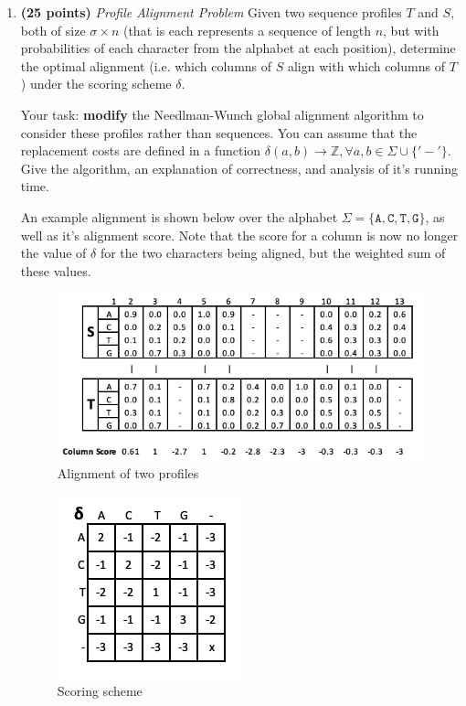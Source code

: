 \documentclass[11pt, oneside]{article}   	%
\begin{document}
\begin{enumerate}
\item \textbf{(25 points)} 
\emph{Profile Alignment Problem} Given two sequence profiles $T$ and $S$, both of size $\sigma \times n$ 
(that is each represents a sequence of length $n$, but with probabilities of each character from the alphabet at each position), 
determine the optimal alignment (i.e. which columns of $S$ align with which columns of $T$) under the scoring scheme $\delta$.

Your task: \textbf{modify} the Needlman-Wunch global alignment algorithm to consider these profiles rather than sequences. 
You can assume that the replacement costs are defined in a function $\delta(a,b) \rightarrow \mathbb{Z} , \forall a,b \in \Sigma \cup \{'-'\}$.
Give the algorithm, an explanation of correctness, and analysis of it's running time. 

An example alignment is shown below over the alphabet $\Sigma=\{\texttt{A},\texttt{C},\texttt{T},\texttt{G}\}$, as well as it's alignment score. 
Note that the score for a column is now no longer the value of $\delta$ for the two characters being aligned, but the weighted sum of these values.


\begin{figure}[h!] %
\begin{centering}
\includegraphics{HW3_Align}
\caption{Alignment of two profiles}
\end{centering}
\end{figure}

\begin{figure}[h!]
\begin{centering}
\includegraphics{HW3_Delta}
\caption{Scoring scheme}
\end{centering}
\end{figure}


\end{enumerate}
\end{document}
